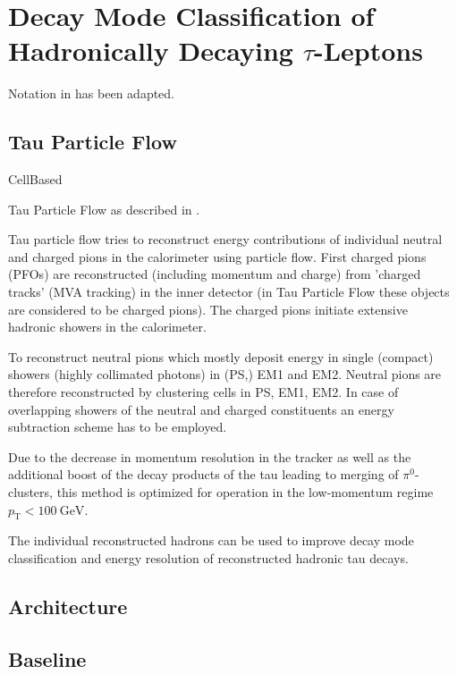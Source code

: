 \chapter{Decay Mode Classification of Hadronically Decaying $\tau$-Leptons}
\label{sec:decaymode}

Notation in \cite{atlas:taurec:decaymodes} has been adapted.

\section{Tau Particle Flow}
\label{sec:tau_pflow}

CellBased \cite{bwinter}

Tau Particle Flow as described in \cite{atlas:taurec:decaymodes}.

Tau particle flow tries to reconstruct energy contributions of individual
neutral and charged pions in the calorimeter using particle flow. First charged
pions (PFOs) are reconstructed (including momentum and charge) from 'charged
tracks' (MVA tracking) in the inner detector (in Tau Particle Flow these objects
are considered to be charged pions). The charged pions initiate extensive
hadronic showers in the calorimeter.

To reconstruct neutral pions which mostly deposit energy in single (compact)
showers (highly collimated photons) in (PS,) EM1 and EM2. Neutral pions are
therefore reconstructed by clustering cells in PS, EM1, EM2. In case of
overlapping showers of the neutral and charged constituents an energy
subtraction scheme has to be employed.

Due to the decrease in momentum resolution in the tracker as well as the
additional boost of the decay products of the tau leading to merging of
$\pi^0$-clusters, this method is optimized for operation in the low-momentum
regime $p_\text{T} < \SI{100}{\giga\electronvolt}$.

The individual reconstructed hadrons can be used to improve decay mode
classification and energy resolution of reconstructed hadronic tau decays.


\section{Architecture}
\label{sec:pfo_architecture}


\section{Baseline}
\label{sec:pfo_baseline}

